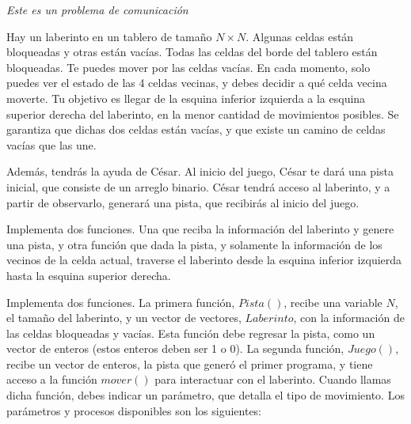 \documentclass[12pt]{scrartcl}
\begin{document}
    
    {\itshape Este es un problema de comunicación}
    
    \vspace{10pt}

    Hay un laberinto en un tablero de tamaño $N\times N$. Algunas celdas están bloqueadas y otras están vacías. Todas las celdas del borde del tablero están bloqueadas. Te puedes mover por las celdas vacías. En cada momento, solo puedes ver el estado de las 4 celdas vecinas, y debes decidir a qué celda vecina moverte. Tu objetivo es llegar de la esquina inferior izquierda a la esquina superior derecha del laberinto, en la menor cantidad de movimientos posibles. Se garantiza que dichas dos celdas están vacías, y que existe un camino de celdas vacías que las une. 

    Además, tendrás la ayuda de César. Al inicio del juego, César te dará una pista inicial, que consiste de un arreglo binario. César tendrá acceso al laberinto, y a partir de observarlo, generará una pista, que recibirás al inicio del juego. 

    
    Implementa dos funciones. Una que reciba la información del laberinto y genere una pista, y otra función que dada la pista, y solamente la información de los vecinos de la celda actual, traverse el laberinto desde la esquina inferior izquierda hasta la esquina superior derecha.


    Implementa dos funciones. La primera función, $Pista()$, recibe una variable $N$, el tamaño del laberinto, y un vector de vectores, $Laberinto$, con la información de las celdas bloqueadas y vacías. Esta función debe regresar la pista, como un vector de enteros (estos enteros deben ser 1 o 0). La segunda función, $Juego()$, recibe un vector de enteros, la pista que generó el primer programa, y tiene acceso a la función $mover()$ para interactuar con el laberinto. Cuando llamas dicha función, debes indicar un parámetro, que detalla el tipo de movimiento. Los parámetros y procesos disponibles son los siguientes:
\end{document}

